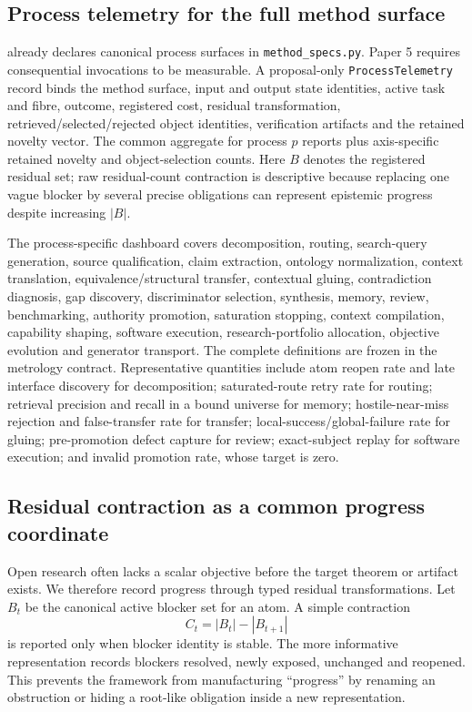 \subsection{Process telemetry for the full method surface}

\RAKL{} already declares canonical process surfaces in \texttt{method\_specs.py}. Paper 5 requires consequential invocations to be measurable. A proposal-only \texttt{ProcessTelemetry} record binds the method surface, input and output state identities, active task and fibre, outcome, registered cost, residual transformation, retrieved/selected/rejected object identities, verification artifacts and the retained novelty vector. The common aggregate for process $p$ reports
plus axis-specific retained novelty and object-selection counts. Here $B$ denotes the registered residual set; raw residual-count contraction is descriptive because replacing one vague blocker by several precise obligations can represent epistemic progress despite increasing $|B|$.

The process-specific dashboard covers decomposition, routing, search-query generation, source qualification, claim extraction, ontology normalization, context translation, equivalence/structural transfer, contextual gluing, contradiction diagnosis, gap discovery, discriminator selection, synthesis, memory, review, benchmarking, authority promotion, saturation stopping, context compilation, capability shaping, software execution, research-portfolio allocation, objective evolution and generator transport. The complete definitions are frozen in the metrology contract. Representative quantities include atom reopen rate and late interface discovery for decomposition; saturated-route retry rate for routing; retrieval precision and recall in a bound universe for memory; hostile-near-miss rejection and false-transfer rate for transfer; local-success/global-failure rate for gluing; pre-promotion defect capture for review; exact-subject replay for software execution; and invalid promotion rate, whose target is zero.

\subsection{Residual contraction as a common progress coordinate}

Open research often lacks a scalar objective before the target theorem or artifact exists. We therefore record progress through typed residual transformations. Let $B_t$ be the canonical active blocker set for an atom. A simple contraction
\[
C_t=|B_t|-|B_{t+1}|
\]
is reported only when blocker identity is stable. The more informative representation records blockers resolved, newly exposed, unchanged and reopened. This prevents the framework from manufacturing ``progress'' by renaming an obstruction or hiding a root-like obligation inside a new representation.

